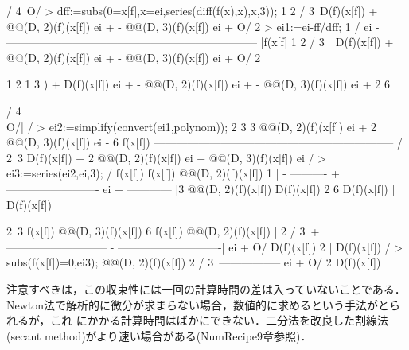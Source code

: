    /  4\
  O\ei /
> dff:=subs({0=x[f],x=ei},series(diff(f(x),x),x,3));
                                         1                     2    /  3\
     D(f)(x[f]) + @@(D, 2)(f)(x[f]) ei + - @@(D, 3)(f)(x[f]) ei  + O\ei /
                                         2                               
> ei1:=ei-ff/dff;
                                      1                                   /      
ei - -------------------------------------------------------------------- |f(x[f]
                                         1                     2    /  3\ \      
     D(f)(x[f]) + @@(D, 2)(f)(x[f]) ei + - @@(D, 3)(f)(x[f]) ei  + O\ei /        
                                         2                                       

                      1                     2   1                     3   
  ) + D(f)(x[f]) ei + - @@(D, 2)(f)(x[f]) ei  + - @@(D, 3)(f)(x[f]) ei  + 
                      2                         6                         

   /  4\\
  O\ei /|
        /
> ei2:=simplify(convert(ei1,polynom));
                              2                         3              
        3 @@(D, 2)(f)(x[f]) ei  + 2 @@(D, 3)(f)(x[f]) ei  - 6 f(x[f])  
      -----------------------------------------------------------------
        /                                                            2\
      3 \2 D(f)(x[f]) + 2 @@(D, 2)(f)(x[f]) ei + @@(D, 3)(f)(x[f]) ei /
> ei3:=series(ei2,ei,3);
                                                           /                   
   f(x[f])     f(x[f]) @@(D, 2)(f)(x[f])           1       |                   
- ---------- + ------------------------- ei + ------------ |3 @@(D, 2)(f)(x[f])
  D(f)(x[f])                    2             6 D(f)(x[f]) |                   
                      D(f)(x[f])                           \                   

                                                              2\             
     3 f(x[f]) @@(D, 3)(f)(x[f])   6 f(x[f]) @@(D, 2)(f)(x[f]) |   2    /  3\
   + --------------------------- - ----------------------------| ei  + O\ei /
             D(f)(x[f])                              2         |             
                                           D(f)(x[f])          /             
> subs(f(x[f])=0,ei3);
                        @@(D, 2)(f)(x[f])   2    /  3\
                        ----------------- ei  + O\ei /
                          2 D(f)(x[f])                

注意すべきは，この収束性には一回の計算時間の差は入っていないことである．Newton法で解析的に微分が求まらない場合，数値的に求めるという手法がとられるが，これ
にかかる計算時間はばかにできない．二分法を改良した割線法(secant method)がより速い場合がある(NumRecipe9章参照)．

